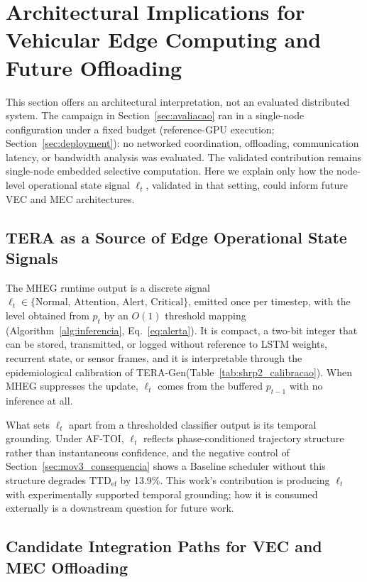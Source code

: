 \documentclass[a4paper,fleqn]{cas-dc}
\newcommand{\TERAGen}{\mbox{TERA-Gen}\xspace}
\newcommand{\AFTOI}{\mbox{AF-TOI}\xspace}
\newcommand{\MHEG}{\mbox{MHEG}\xspace}
\begin{document}
\section{Architectural Implications for Vehicular Edge Computing and Future Offloading}
\label{sec:vecmec}
This section offers an architectural interpretation, not an evaluated
distributed system. The campaign in Section~\ref{sec:avaliacao} ran in a single-node
configuration under a fixed budget {\color{\revcolor}(reference-GPU
execution; Section~\ref{sec:deployment})}: no networked coordination, offloading,
communication latency, or bandwidth analysis was evaluated. The validated
contribution remains single-node embedded selective computation. Here we explain
only how the node-level operational state signal $\ell_t$, validated in that
setting, could inform future VEC and MEC architectures.
\subsection{TERA as a Source of Edge Operational State Signals}
\label{sec:tera_opsignal}
The \MHEG runtime output is a discrete signal
$\ell_t \in \{\text{Normal},\, \text{Attention},\, \text{Alert},\,
\text{Critical}\}$, emitted once per timestep{\color{\revcolor}, with the level
obtained from $p_t$ by an $O(1)$ threshold mapping
(Algorithm~\ref{alg:inferencia}, Eq.~\ref{eq:alerta})}. It is compact, a two-bit
integer that can be stored, transmitted, or logged without reference to LSTM
weights, recurrent state, or sensor frames, and it is interpretable through the
epidemiological calibration of \TERAGen (Table~\ref{tab:shrp2_calibracao}). When
\MHEG suppresses the update, $\ell_t$ comes from the buffered $p_{t-1}$ with no
inference at all.

What sets $\ell_t$ apart from a thresholded classifier output is its temporal
grounding. Under \AFTOI, $\ell_t$ reflects phase-conditioned trajectory
structure rather than instantaneous confidence, and the negative control of
Section~\ref{sec:mov3_consequencia} shows a Baseline scheduler without this
structure degrades $\mathrm{TTD}_{\mathrm{ef}}$ by {\color{\revcolor}13.9\%}. This work's
contribution is producing $\ell_t$ with experimentally supported temporal
grounding; how it is consumed externally is a downstream question for future
work.
\subsection{Candidate Integration Paths for VEC and MEC Offloading}
\label{sec:vecmec_implications}
\end{document}
